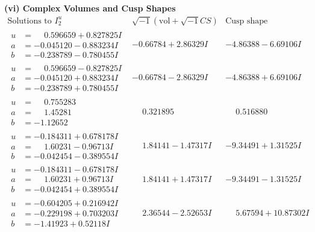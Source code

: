 \documentclass[1p]{elsarticle_modified}
\theoremstyle{definition}
\newcommand{\I}{\sqrt{-1}}
\begin{document}
\newpage\flushleft \textbf{(vi) Complex Volumes and Cusp Shapes}
$$\begin{array}{c|c|c}  
\text{Solutions to }I^u_{2}& \I (\text{vol} + \sqrt{-1}CS) & \text{Cusp shape}\\
 \hline 
\begin{aligned}
u &= \phantom{-}0.596659 + 0.827825 I \\
a &= -0.045120 - 0.883234 I \\
b &= -0.238789 - 0.780455 I\end{aligned}
 & -0.66784 + 2.86329 I & -4.86388 - 6.69106 I \\ \hline\begin{aligned}
u &= \phantom{-}0.596659 - 0.827825 I \\
a &= -0.045120 + 0.883234 I \\
b &= -0.238789 + 0.780455 I\end{aligned}
 & -0.66784 - 2.86329 I & -4.86388 + 6.69106 I \\ \hline\begin{aligned}
u &= \phantom{-}0.755283\phantom{ +0.000000I} \\
a &= \phantom{-}1.45281\phantom{ +0.000000I} \\
b &= -1.12652\phantom{ +0.000000I}\end{aligned}
 & \phantom{-}0.321895\phantom{ +0.000000I} & \phantom{-}0.516880\phantom{ +0.000000I} \\ \hline\begin{aligned}
u &= -0.184311 + 0.678178 I \\
a &= \phantom{-}1.60231 - 0.96713 I \\
b &= -0.042454 - 0.389554 I\end{aligned}
 & \phantom{-}1.84141 - 1.47317 I & -9.34491 + 1.31525 I \\ \hline\begin{aligned}
u &= -0.184311 - 0.678178 I \\
a &= \phantom{-}1.60231 + 0.96713 I \\
b &= -0.042454 + 0.389554 I\end{aligned}
 & \phantom{-}1.84141 + 1.47317 I & -9.34491 - 1.31525 I \\ \hline\begin{aligned}
u &= -0.604205 + 0.216942 I \\
a &= -0.229198 + 0.703203 I \\
b &= -1.41923 + 0.52118 I\end{aligned}
 & \phantom{-}2.36544 - 2.52653 I & \phantom{-}5.67594 + 10.87302 I \\ \hline\begin{aligned}

\end{aligned}
\end{array}$$
\end{document}
